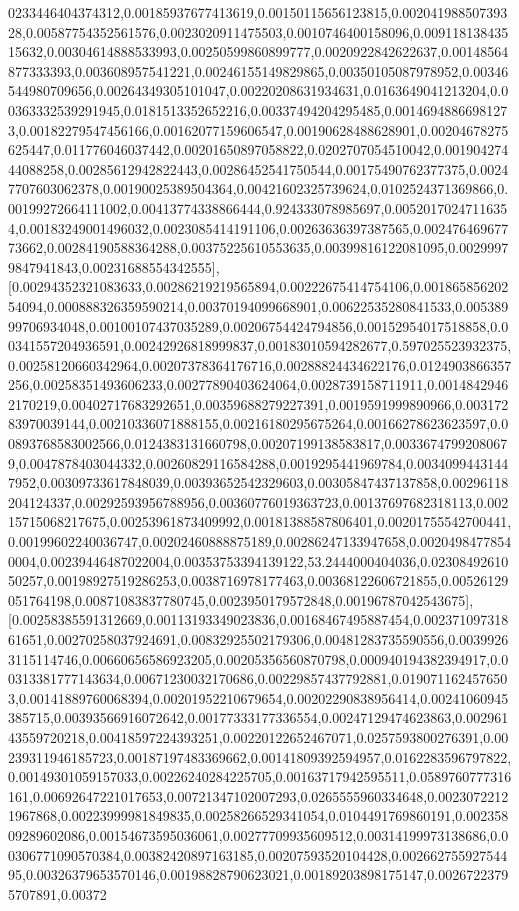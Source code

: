 \documentclass{article}
\begin{document}
0233446404374312,0.00185937677413619,0.00150115656123815,0.00204198850739328,0.00587754352561576,0.0023020911475503,0.0010746400158096,0.00911813843515632,0.00304614888533993,0.00250599860899777,0.0020922842622637,0.00148564877333393,0.003608957541221,0.00246155149829865,0.00350105087978952,0.00346544980709656,0.00264349305101047,0.00220208631934631,0.0163649041213204,0.00363332539291945,0.0181513352652216,0.00337494204295485,0.00146948866981273,0.00182279547456166,0.00162077159606547,0.00190628488628901,0.00204678275625447,0.011776046037442,0.00201650897058822,0.0202707054510042,0.00190427444088258,0.00285612942822443,0.00286452541750544,0.00175490762377375,0.00247707603062378,0.00190025389504364,0.00421602325739624,0.0102524371369866,0.00199272664111002,0.00413774338866444,0.924333078985697,0.00520170247116354,0.00183249001496032,0.0023085414191106,0.00263636397387565,0.00247646967773662,0.00284190588364288,0.00375225610553635,0.00399816122081095,0.00299979847941843,0.00231688554342555],[0.00294352321083633,0.00286219219565894,0.00222675414754106,0.00186585620254094,0.000888326359590214,0.00370194099668901,0.00622535280841533,0.00538999706934048,0.00100107437035289,0.00206754424794856,0.00152954017518858,0.00341557204936591,0.00242926818999837,0.00183010594282677,0.597025523932375,0.00258120660342964,0.00207378364176716,0.00288824434622176,0.0124903866357256,0.00258351493606233,0.00277890403624064,0.0028739158711911,0.00148429462170219,0.00402717683292651,0.00359688279227391,0.0019591999890966,0.00317283970039144,0.00210336071888155,0.00216180295675264,0.00166278623623597,0.00893768583002566,0.0124383131660798,0.00207199138583817,0.00336747992080679,0.0047878403044332,0.00260829116584288,0.0019295441969784,0.00340994431447952,0.00309733617848039,0.00393652542329603,0.00305847437137858,0.00296118204124337,0.00292593956788956,0.00360776019363723,0.00137697682318113,0.00215715068217675,0.00253961873409992,0.00181388587806401,0.00201755542700441,0.00199602240036747,0.00202460888875189,0.00286247133947658,0.00204984778540004,0.00239446487022004,0.00353753394139122,53.2444000404036,0.0230849261050257,0.00198927519286253,0.0038716978177463,0.00368122606721855,0.00526129051764198,0.00871083837780745,0.0023950179572848,0.00196787042543675],[0.00258385591312669,0.00113193349023836,0.00168467495887454,0.00237109731861651,0.00270258037924691,0.00832925502179306,0.00481283735590556,0.00399263115114746,0.00660656586923205,0.00205356560870798,0.000940194382394917,0.00313381777143634,0.00671230032170686,0.00229857437792881,0.0190711624576503,0.00141889760068394,0.00201952210679654,0.00202290838956414,0.00241060945385715,0.00393566916072642,0.00177333177336554,0.00247129474623863,0.00296143559720218,0.00418597224393251,0.00220122652467071,0.0257593800276391,0.00239311946185723,0.00187197483369662,0.00141809392594957,0.0162283596797822,0.00149301059157033,0.00226240284225705,0.00163717942595511,0.0589760777316161,0.00692647221017653,0.00721347102007293,0.0265555960334648,0.00230722121967868,0.00223999981849835,0.00258266529341054,0.0104491769860191,0.00235809289602086,0.00154673595036061,0.00277709935609512,0.00314199973138686,0.00306771090570384,0.00382420897163185,0.00207593520104428,0.00266275592754495,0.00326379653570146,0.00198828790623021,0.00189203898175147,0.00267223795707891,0.00372
\end{document}
